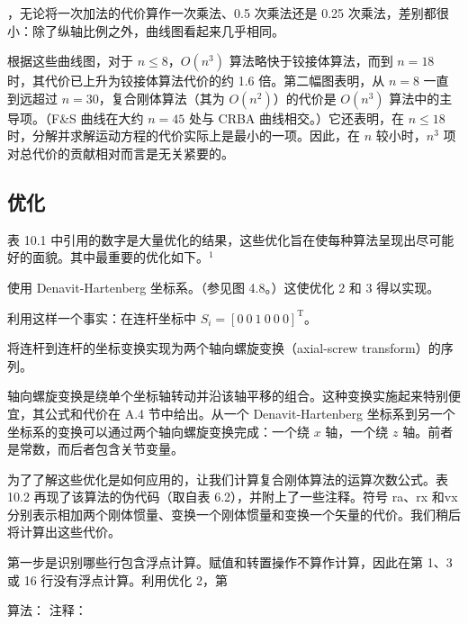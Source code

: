 \documentclass[10pt,a4paper]{book}
\theoremstyle{thmstyle} %
\theoremstyle{defstyle} %
\theoremstyle{prostyle} %
\begin{document}
，无论将一次加法的代价算作一次乘法、0.5 次乘法还是 0.25 次乘法，差别都很小：除了纵轴比例之外，曲线图看起来几乎相同。



根据这些曲线图，对于 $n \leq 8$，$O(n^3)$ 算法略快于铰接体算法，而到 $n=18$ 时，其代价已上升为铰接体算法代价的约 1.6 倍。第二幅图表明，从 $n=8$ 一直到远超过 $n=30$，复合刚体算法（其为 $O(n^2)$）的代价是 $O(n^3)$ 算法中的主导项。（F\&S 曲线在大约 $n=45$ 处与 CRBA 曲线相交。）它还表明，在 $n \leq 18$ 时，分解并求解运动方程的代价实际上是最小的一项。因此，在 $n$ 较小时，$n^3$ 项对总代价的贡献相对而言是无关紧要的。



\subsection{优化}





表 10.1 中引用的数字是大量优化的结果，这些优化旨在使每种算法呈现出尽可能好的面貌。其中最重要的优化如下。$^{1}$



使用 Denavit-Hartenberg 坐标系。（参见图 4.8。）这使优化 2 和 3 得以实现。



利用这样一个事实：在连杆坐标中 $S_i = [0\ 0\ 1\ 0\ 0\ 0]^{\text{T}}$。



将连杆到连杆的坐标变换实现为两个轴向螺旋变换（axial-screw transform）的序列。



轴向螺旋变换是绕单个坐标轴转动并沿该轴平移的组合。这种变换实施起来特别便宜，其公式和代价在 A.4 节中给出。从一个 Denavit-Hartenberg 坐标系到另一个坐标系的变换可以通过两个轴向螺旋变换完成：一个绕 $x$ 轴，一个绕 $z$ 轴。前者是常数，而后者包含关节变量。



为了了解这些优化是如何应用的，让我们计算复合刚体算法的运算次数公式。表 10.2 再现了该算法的伪代码（取自表 6.2），并附上了一些注释。符号 ra、rx 和vx 分别表示相加两个刚体惯量、变换一个刚体惯量和变换一个矢量的代价。我们稍后将计算出这些代价。



第一步是识别哪些行包含浮点计算。赋值和转置操作不算作计算，因此在第 1、3 或 16 行没有浮点计算。利用优化 2，第



算法： 注释：
\end{document}
